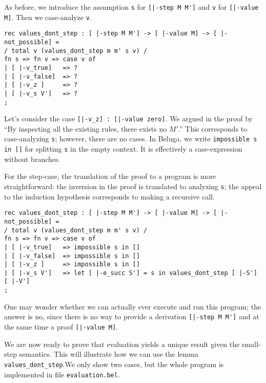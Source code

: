 As before, we introduce the assumption \lstinline!s! for
\lstinline![|-step M M']! and \lstinline!v! for
\lstinline![|-value M]!. Then we case-analyze \lstinline!v!.

\begin{lstlisting}
rec values_dont_step : [ |-step M M'] -> [ |-value M] -> [ |-not_possible] =
/ total v (values_dont_step m m' s v) /
fn s => fn v => case v of
| [ |-v_true]   => ?
| [ |-v_false]  => ?
| [ |-v_z ]     => ?
| [ |-v_s V']   => ?
;
\end{lstlisting}

Let's consider the case \lstinline![|-v_z] : [|-value zero]!. We argued in the
proof by ``By inspecting all the existing rules, there exists no $M'$.'' This
corresponds to case-analyzing \lstinline!s!; however, there are no cases. In
Beluga, we write \lstinline!impossible s in []! for splitting \lstinline!s! in
the empty context. It is effectively a case-expression without branches.

For the step-case, the translation of the proof to a program is more
straightforward: the inversion in the proof is translated to analyzing
\lstinline!s!; the appeal to the induction hypothesis corresponds to making a
recursive call.

\begin{lstlisting}
rec values_dont_step : [ |-step M M'] -> [ |-value M] -> [ |-not_possible] =
/ total v (values_dont_step m m' s v) /
fn s => fn v => case v of
| [ |-v_true]   => impossible s in []
| [ |-v_false]  => impossible s in []
| [ |-v_z ]     => impossible s in []
| [ |-v_s V']   => let [ |-e_succ S'] = s in values_dont_step [ |-S'] [ |-V']
;
\end{lstlisting}

One may wonder whether we can actually ever execute and run this program; the
answer is no, since there is no way to provide a derivation
\lstinline![|-step M M']! and at the same time a proof \lstinline![|-value M]!.


We are now ready to prove that evaluation yields a unique result given the
small-step semantics. This will illustrate how we can use the lemma \lstinline!values_dont_step!.We only show two cases, but the whole program is
implemented in file \lstinline!evaluation.bel!.

